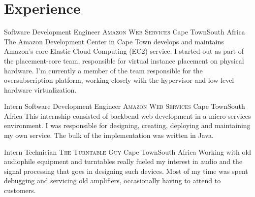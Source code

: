 \documentclass[11pt,a4paper,sans]{moderncv}
\begin{document}


\section{Experience}

{Software Development Engineer}
{\textsc{Amazon Web Services}}
{\newline Cape Town}{South Africa}
{The Amazon Development Center in Cape Town develops and maintains Amazon's
core Elastic Cloud Computing (EC2) service. I started out as part of the
placement-core team, responsible for virtual instance placement on physical
hardware. I'm currently a member of the team responsible for the
oversubscription platform, working closely with the hypervisor and low-level
hardware virtualization.}

{Intern Software Development Engineer}
{\textsc{Amazon Web Services}}
{\newline Cape Town}{South Africa}
{This internship consisted of backbend web development in a micro-services
environment. I was responsible for designing, creating, deploying and maintaining
my own service. The bulk of the implementation was written in Java.}

{Intern Technician}
{\textsc{The Turntable Guy}}
{\newline Cape Town}{South Africa}
{Working with old audiophile equipment and turntables really fueled my interest in
audio and the signal processing that goes in designing such devices. Most of my
time was spent debugging and servicing old amplifiers, occasionally having to
attend to customers.}
\end{document}
